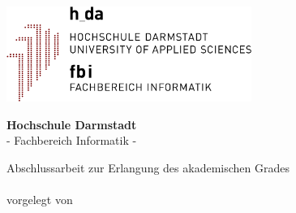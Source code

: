 \documentclass[
11pt, %
english,
singlespacing, %
headsepline, %
]{MastersDoctoralThesis} %
\author{Roland Weilbacher}
\begin{document}
\frontmatter %

\pagestyle{plain} %


\begin{titlepage}
\begin{center}

\vspace*{.06\textheight}
\includegraphics[width=8cm]{Logo/h_da_logo_fbi}
\vspace*{.02\textheight}

\Large{\textbf{\textsf{Hochschule Darmstadt}}} \\
\Large{\textsf{- Fachbereich Informatik -}}
\vspace*{.06\textheight}
 
\huge{\textbf{\textsf{\ttitle}}}
 
\vspace{3em}

\large{\textsf{Abschlussarbeit zur Erlangung des akademischen Grades}} \\ \vspace{0.5em}
\Large{\textbf{\textsf{\degreename}}} \\ \vspace{0.5em}
\large{\textsf{vorgelegt von}}
 
\vspace*{.04\textheight}
 
\textsf{\authorname}
 
\vspace{4.0em}

\begin{spacing}{1.5}
\textsf{}            \textsf{\makebox[7cm][r]{\supname}} \\
\textsf{}           \textsf{\makebox[7cm][r]{\examname}} \\
\textsf{\small{}}  \textsf{\small{}} \\
\textsf{\small{}}   \textsf{\small{}}
\end{spacing}

\end{center}
\end{titlepage}
\end{document}
